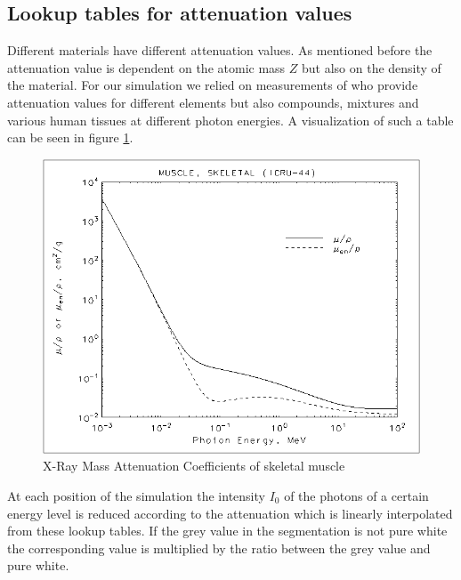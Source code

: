 \subsection{Lookup tables for attenuation values}
\par Different materials have different attenuation values. As mentioned before the attenuation value is dependent on the atomic mass \(Z\) but also on the density of the material. For our simulation we relied on measurements of \cite{AttenuationTable} who provide attenuation values for different elements but also compounds, mixtures and various human tissues at different photon energies. A visualization of such a table can be seen in figure \ref{muscleAtt}.
\begin{figure}[h]
	\centering
	\includegraphics[width=0.5\linewidth]{images/muscle.png}
	\caption{X-Ray Mass Attenuation Coefficients of skeletal muscle\cite{AttenuationTable}}
	\label{muscleAtt}
\end{figure}
\par At each position of the simulation the intensity \(I_{0}\) of the photons of a certain energy level is reduced according to the attenuation which is linearly interpolated from these lookup tables. If the grey value in the segmentation is not pure white the corresponding value is multiplied by the ratio between the grey value and pure white.
